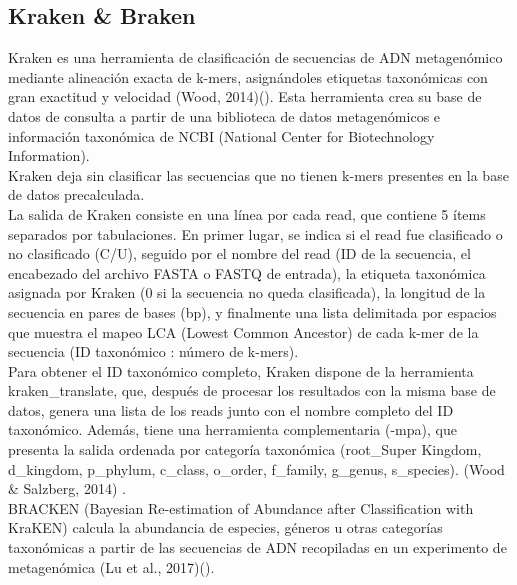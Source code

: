 \subsection{Kraken \& Braken}
Kraken es una herramienta de clasificación de secuencias de ADN metagenómico mediante alineación exacta de k-mers, asignándoles etiquetas taxonómicas con gran exactitud y velocidad (Wood, 2014)(\cite{wood2014kraken}). Esta herramienta crea su base de datos de consulta a partir de una biblioteca de datos metagenómicos e información taxonómica de NCBI (National Center for Biotechnology Information).\\

Kraken deja sin clasificar las secuencias que no tienen k-mers presentes en la base de datos precalculada.\\

La salida de Kraken consiste en una línea por cada read, que contiene 5 ítems separados por tabulaciones. En primer lugar, se indica si el read fue clasificado o no clasificado (C/U), seguido por el nombre del read (ID de la secuencia, el encabezado del archivo FASTA o FASTQ de entrada), la etiqueta taxonómica asignada por Kraken (0 si la secuencia no queda clasificada), la longitud de la secuencia en pares de bases (bp), y finalmente una lista delimitada por espacios que muestra el mapeo LCA (Lowest Common Ancestor) de cada k-mer de la secuencia (ID taxonómico : número de k-mers).\\

Para obtener el ID taxonómico completo, Kraken dispone de la herramienta kraken\_translate, que, después de procesar los resultados con la misma base de datos, genera una lista de los reads junto con el nombre completo del ID taxonómico. Además, tiene una herramienta complementaria (-mpa), que presenta la salida ordenada por categoría taxonómica (root\_Super Kingdom, d\_kingdom, p\_phylum, c\_class, o\_order, f\_family, g\_genus, s\_species). (Wood \& Salzberg, 2014) .\\


BRACKEN (Bayesian Re-estimation of Abundance after Classification with KraKEN) calcula la abundancia de especies, géneros u otras categorías taxonómicas a partir de las secuencias de ADN recopiladas en un experimento de metagenómica (Lu et al., 2017)(\cite{lu2017bracken}).\\

